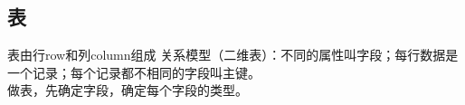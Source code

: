 \documentclass[UTF8]{../computerUniverse}
\begin{document}
    \begin{comment}
        创建的root密码是123456
        登录：cmd:mysql -h主机名空格-u用户名空格-p密码
        cmd mysql -uroot -p回车
        mysql -hlocalhost -uroot -p -P3306
        登录同时打开数据库：
        mysql -uroot -p -D 数据库名字
    
        修改密码：mysqladmin -uroot -p旧密码 password 新密码\\
        
        
        退出： exit
        quit
        \q
        ctrl+c
        
        修改命令提示符的名称：如修改为shepherd,每次关闭mysql后失效
        mysql -uroot -p --prompt='shepherd>'
        mysql -uroot -p --prompt='\h~\a~\d~\D'
        h是host，a是用户名，d是选择的数据库，D是日期
    
        查询版本号：mysql -V
        mysql --version
    
        ;和\g 是执行改行命令
        \c 不执行改行
        help，\h或者 ？ 加上关键字可以查找帮助
    
        支持折行写，单引号不要折行；
        MySQL关键字大写。
        库、表、字段名称要避开关键字，否则需要反引号以区分。
    
    
        批命令：
        select user();
        select version();
        select now();
        select current_date();
        select current_time();
        select current_timestamp();
        以上几行保存，在cmd中输入以下：\\
        \. E:\Notes\Notes_Latex\MySQL_study\Codes\t001.sql  
    
    
    
        数据库的基本操作
    
        DATABASE 和 SCHEMA 一样
        show databases; -- 查看数据库
        create database t001; -- 注意双减号注释，前后都需要空格
        show databases;
        select database(); -- a查看当前选定的库
        use t001; -- 打开数据库
        select database();
        DROP DATABASE IF EXISTS t001; -- c删除库
    
        CREATE DATABASE IF NOT EXISTS t007 DEFAULT CHARACTER SET 'GBK'; -- 指定编码
        SHOW WARNINGS;
        SHOW CREATE DATABASE t007;
        ALTER DATABASE t007 DEFAULT CHARACTER SET 'UTF8'; -- 修改编码
        SHOW CREATE DATABASE t007;
    
    
    \end{comment}
    
    
    \subsection{表}
    表由行row和列column组成
    关系模型（二维表）：不同的属性叫字段；每行数据是一个记录；每个记录都不相同的字段叫主键。\\
    做表，先确定字段，确定每个字段的类型。
    
\end{document}
